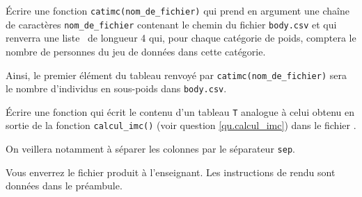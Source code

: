 \question{} \'Ecrire une fonction \texttt{catimc(nom\_de\_fichier)} qui prend en argument une chaîne de caractères \texttt{nom\_de\_fichier} contenant le chemin du fichier \texttt{body.csv} et qui renverra une liste \python\ de longueur 4 qui, pour chaque catégorie de poids, comptera le nombre de personnes du jeu de données dans cette catégorie. 
    
    Ainsi, le premier élément du tableau renvoyé par \texttt{catimc(nom\_de\_fichier)} sera le nombre d'individus en sous-poids dans \texttt{body.csv}. 

%

\question{} \label{q.write} \'Ecrire une fonction  qui écrit le contenu d'un tableau \texttt{T} analogue à celui obtenu en sortie de la fonction \texttt{calcul\_imc()} (voir question \ref{qu.calcul_imc}) dans le fichier . 

On veillera notamment à séparer les colonnes par le séparateur \texttt{sep}.
    
Vous enverrez le fichier produit à l'enseignant. Les instructions de rendu sont données dans le préambule.